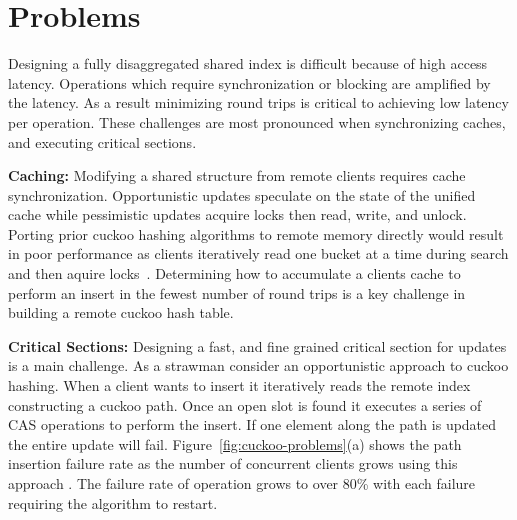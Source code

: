 \section{Problems}
\label{sec:problems}

Designing a fully disaggregated shared index is difficult
because of high access latency. Operations which require
synchronization or blocking are amplified by the latency. As
a result minimizing round trips is critical to achieving low
latency per operation. These challenges are most pronounced
when synchronizing caches, and executing critical sections.


\textbf{Caching:} Modifying a shared structure from remote
clients requires cache synchronization. Opportunistic
updates speculate on the state of the unified cache while
pessimistic updates acquire locks then read, write, and
unlock. Porting prior cuckoo hashing algorithms to remote
memory directly would result in poor performance as clients
iteratively read one bucket at a time during search and then
aquire locks~\cite{cuckoo-improvements, memc3, pilaf}.
Determining how to accumulate a clients cache to perform an
insert in the fewest number of round trips is a key
challenge in building a remote cuckoo hash table.



\textbf{Critical Sections:} Designing a fast, and fine
grained critical section for updates is a main challenge. As
a strawman consider an opportunistic approach to cuckoo
hashing. When a client wants to insert it iteratively reads
the remote index constructing a cuckoo path. Once an open
slot is found it executes a series of CAS operations to
perform the insert. If one element along the path is updated
the entire update will fail.
Figure~\ref{fig:cuckoo-problems}(a) shows the path insertion
failure rate as the number of concurrent clients grows using
this approach . The failure rate of operation grows to over 80\% with
each failure requiring the algorithm to restart.

